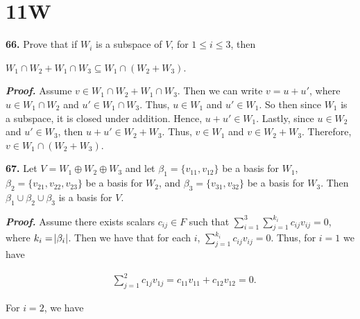 \documentclass[12pt, a4paper]{article}
\begin{document}
\vspace{2mm}



\newpage

\section{11W}

\noindent\textbf{66.} Prove that if $W_i$ is a subspace of $V$, for $1\leq i\leq 3$, then

\vspace{2mm}

\centerline{$W_1\cap W_2+W_1\cap W_3\subseteq W_1\cap(W_2+W_3)$.}

\vspace{4mm}\par

\textbf{\textit{Proof.}} Assume $v\in W_1\cap W_2+W_1\cap W_3$. Then we can write $v=u+u'$, where $u\in W_1\cap W_2$ and $u'\in W_1\cap W_3$. Thus, $u\in W_1$ and $u'\in W_1$. So then since $W_1$ is a subspace, it is closed under addition. Hence, $u+u'\in W_1$. Lastly, since $u\in W_2$ and $u'\in W_3$, then $u+u'\in W_2+W_3$. Thus, $v\in W_1$ and $v\in W_2+W_3$. Therefore, $v\in W_1\cap(W_2+W_3)$.

\vspace{4mm}

\noindent\textbf{67.} Let $V=W_1\oplus W_2\oplus W_3$ and let $\beta_1=\{v_{11},v_{12}\}$ be a basis for $W_1$, $\beta_2=\{v_{21},v_{22},v_{23}\}$ be a basis for $W_2$, and $\beta_3=\{v_{31},v_{32}\}$ be a basis for $W_3$. Then $\beta_1\cup\beta_2\cup\beta_3$ is a basis for $V$.

\vspace{4mm}\par

\textbf{\textit{Proof.}} Assume there exists scalars $c_{ij}\in F$ such that $\sum_{i=1}^3\sum_{j=1}^{k_i}c_{ij}v_{ij}=0$, where $k_i=\abs{\beta_i}$. Then we have that for each $i$, $\sum_{j=1}^{k_i}c_{ij}v_{ij}=0$. Thus, for $i=1$ we have

\begin{equation}
    \begin{split}
        &\sum\limits_{j=1}^2 c_{1j}v_{1j} = c_{11}v_{11}+c_{12}v_{12} = 0.
    \end{split}
\end{equation}

\vspace{2mm}

\noindent For $i=2$, we have
\end{document}
